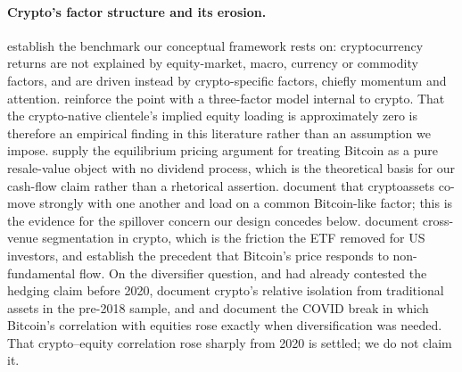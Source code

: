 \documentclass[12pt,a4paper]{article}
\begin{document}
\paragraph{Crypto's factor structure and its erosion.} \citet{liu2020risks} establish the benchmark our conceptual framework rests on: cryptocurrency returns are not explained by equity-market, macro, currency or commodity factors, and are driven instead by crypto-specific factors, chiefly momentum and attention. \citet{liu2022common} reinforce the point with a three-factor model internal to crypto. That the crypto-native clientele's implied equity loading is approximately zero is therefore an empirical finding in this literature rather than an assumption we impose. \citet{biais2023equilibrium} supply the equilibrium pricing argument for treating Bitcoin as a pure resale-value object with no dividend process, which is the theoretical basis for our cash-flow claim rather than a rhetorical assertion. \citet{hu2019cryptocurrencies} document that cryptoassets co-move strongly with one another and load on a common Bitcoin-like factor; this is the evidence for the spillover concern our design concedes below. \citet{makarov2019trading} document cross-venue segmentation in crypto, which is the friction the ETF removed for US investors, and \citet{griffin2020is} establish the precedent that Bitcoin's price responds to non-fundamental flow. On the diversifier question, \citet{bouri2016on} and \citet{baur2017bitcoin} had already contested the hedging claim before 2020, \citet{corbet2018exploring} document crypto's relative isolation from traditional assets in the pre-2018 sample, and \citet{conlon2020safe} and \citet{corbet2020the} document the COVID break in which Bitcoin's correlation with equities rose exactly when diversification was needed. That crypto--equity correlation rose sharply from 2020 is settled; we do not claim it.
\end{document}
